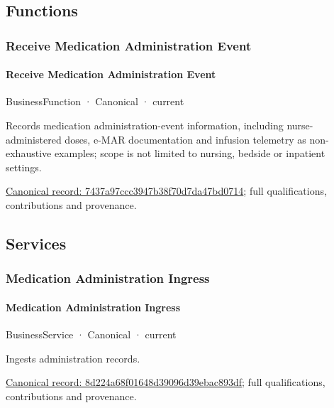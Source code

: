 \subsection{Functions}

\subsubsection{Receive Medication Administration Event}

\paragraph{Receive Medication Administration Event}

\label{element:7437a97ccc3947b38f70d7da47bd0714}
{\small BusinessFunction · Canonical · current}\par

Records medication administration-event information, including nurse-administered doses, e-MAR documentation and infusion telemetry as non-exhaustive examples; scope is not limited to nursing, bedside or inpatient settings.


{\footnotesize \href{../../../../continuum/business/business-function/7437a97ccc3947b38f70d7da47bd0714.md}{Canonical record: 7437a97ccc3947b38f70d7da47bd0714}; full qualifications, contributions and provenance.}\par
\subsection{Services}

\subsubsection{Medication Administration Ingress}

\paragraph{Medication Administration Ingress}

\label{element:8d224a68f01648d39096d39ebac893df}
{\small BusinessService · Canonical · current}\par

Ingests administration records.


{\footnotesize \href{../../../../continuum/business/business-service/8d224a68f01648d39096d39ebac893df.md}{Canonical record: 8d224a68f01648d39096d39ebac893df}; full qualifications, contributions and provenance.}\par
